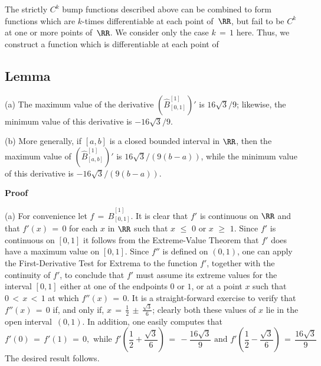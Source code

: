 {\VV

        The strictly $C^{k}$ bump functions described above can be combined to form functions
    which are $k$-times differentiable at each point of~${\RR}$, but fail to be $C^{k}$ at one or more points of~${\RR}$.
    We consider only the case $k \,=\, 1$ here. Thus, we construct a function which is differentiable at each point of

\V

            \subsection{\small{\bf Lemma}}
            \label{LemmaE35.120}

\V

\hspace*{\parindent}(a) The maximum value of the derivative $\left(\hat{B}^{[1]}_{[0,1]}\right)'$ is $16\sqrt{3}/9$;
    likewise, the minimum value of this derivative is $-16\sqrt{3}/9$.

\V

        (b) More generally, if $[a,b]$ is a closed bounded interval in ${\RR}$, then the maximum value of
    $\left(\hat{B}^{[1]}_{[a,b]}\right)'$ is $16\sqrt{3}/(9(b-a))$, while the minimum value of this derivative is $-16\sqrt{3}/(9(b-a))$.

\V

        {\bf Proof}\,

\V

        (a) For convenience let $f \,=\, \hat{B}^{[1]}_{[0,1]}$.
    It is clear that $f'$ is continuous on ${\RR}$ and that $f'(x) \,=\, 0$ for each $x$ in ${\RR}$ such that $x\,\,{\leq}\,\,0$ or $x\,\,{\geq}\,\,1$.
    Since $f'$ is continuous on $[0,1]$ it follows from the Extreme-Value Theorem that $f'$ does have a maximum value on $[0,1]$.
    Since $f''$ is defined on $(0,1)$, one can apply the First-Derivative Test for Extrema to the function $f'$,
    together with the continuity of $f'$, to conclude that $f'$ must assume its extreme values for the interval $[0,1]$ either at one of the endpoints $0$ or $1$, or at a point $x$ such that $0\,<\,x\,<\,1$ at which $f''(x) \,=\, 0$.
    It is a straight-forward exercise to verify that $f''(x) \,=\, 0$ if, and only if, $x \,=\,  {\displaystyle \frac{1}{2}\,{\pm}\, \frac{\sqrt{3}}{6}}$;
    clearly both these values of $x$ lie in the open interval~$(0,1)$.
    In addition, one easily computes that
        \begin{displaymath}
        f'(0) \,=\, f'(1) \,=\, 0, \mbox{ while } 
        f'\left(\frac{1}{2} + \frac{\sqrt{3}}{6}\right) \,=\, -\frac{16\sqrt{3}}{9} \mbox{ and } f'\left(\frac{1}{2} - \frac{\sqrt{3}}{6}\right) \,=\, \frac{16\sqrt{3}}{9}
        \end{displaymath}
    The desired result follows.

}
